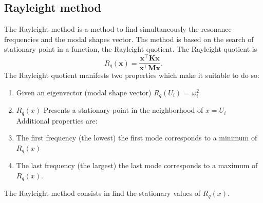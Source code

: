 \documentclass[twosided,a4paper]{article}           %
\newcommand{\tr}{^{{\bm \top}}}
\begin{document}
\subsection{Rayleight method}
The Rayleight method is a method to find simultaneously the resonance frequencies and the modal shapes vector. Ths method is based on the search of stationary point in a function, the Rayleight quotient.
The Rayleight quotient is 
	\begin{equation}
		R_q(\bm x) = \dfrac{\bm x\tr \bm K \bm x}{\bm x\tr \bm M \bm x} .
	\end{equation}
The Rayleight quotient manifests two properties which make it suitable to do so:
\begin{enumerate}
	\item Given an eigenvector (modal shape vector) $R_q(U_i)$ = $\omega_i^2$
	\item $R_q(x)$ Presents a stationary point in the neighborhood of $x = U_i$\\

Additional properties are:

	\item The first frequency (the lowest) the first mode corresponds to a minimum of $R_q(x)$
	\item The last frequency (the largest) the last mode corresponds to a maximum of $R_q(x)$.
\end{enumerate}
The Rayleight method consists in find the stationary values of $R_q(x)$.
\end{document}
